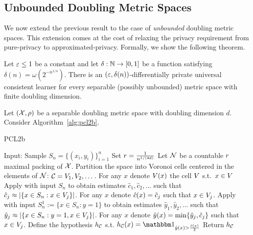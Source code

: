 \documentclass[12pt,a4paper,oneside,onecolumn]{book}
\begin{document}
\subsection{Unbounded Doubling Metric Spaces}

We now extend the previous result to the case of {\em unbounded} doubling metric spaces. This extension comes at the cost of relaxing the privacy requirement from pure-privacy to approximated-privacy.  Formally, we show the following theorem.

\begin{theorem}\label{thm:unbounded-doubling-main}
Let $\varepsilon\leq1$ be a constant and let $\delta:\mathbb{N}\rightarrow[0,1]$ be a function satisfying $\delta(n)=\omega(2^{-n^{1/4}})$.
There is an $(\varepsilon,\delta(n))$-differentially private universal consistent learner for every separable (possibly unbounded) metric space with finite doubling dimension.
\end{theorem}




Let $(\mathcal{X},\rho)$ be a separable doubling metric space with doubling dimension $d$. Consider Algorithm~\ref{alg:pcl2b}.

\begin{algorithm}
  \caption{PCL2b}\label{alg:pcl2b}
  \begin{algorithmic}[1]
    \State Input: Sample $S_n = \{(x_i,y_i)\}_{i=1}^n$ 
    \State Set $r=\frac{1}{n^{1/(4d)}}$
    \State Let $\mathcal{N}$ be a countable $r$ maximal packing of $\mathcal{X}$.
    \State Partition the space into Voronoi cells centered in the elements of $\mathcal{N}$: $\mathcal{C} = V_1,V_2,\dots$.
    \State For any $x$ denote $V(x)$ the cell $V$ s.t.\ $x \in V$   
    \State Apply  with input $S_n$ to obtain estimates $\hat{c}_1,\hat{c}_2,\dots$ such that $\hat{c}_j\approx|\{x\in S_n : x\in V_j\}|$.   
    \State For any $x$ denote $\hat{c}(x)=\hat{c}_j$ such that $x\in V_j$.
    \State Apply  with input $S_n^1:=\{x\in S_n : y=1\}$ to obtain estimates $\hat{y}_1,\hat{y}_2,\dots$ such that $\hat{y}_j\approx|\{x\in S_n : y=1, x\in V_j\}|$.   
    \State For any $x$ denote $\hat{y}(x)=\min\{\hat{y}_j,\hat{c}_j\}$ such that $x\in V_j$.    
    \State Define the hypothesis $h_{\mathcal{C}}$ s.t.
    $h_{\partition}(x) = \indicator{\dplabels(x) > \frac{\dpcount(x)}{2}}$ \label{alg:PCL2b_define_h}
    \State Return $h_{\mathcal{C}}$
  \end{algorithmic}
\end{algorithm}
\end{document}
